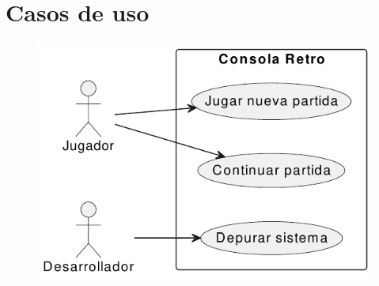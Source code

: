 \documentclass[11pt,a4paper]{article}
\begin{document}
\section{Casos de uso}

\begin{figure}[htpb]
\centering 
\includegraphics[width=.60\textwidth]{../Figuras/casos_uso.pdf}
\label{fig:diagCasosUso}
\end{figure}



\end{document}
